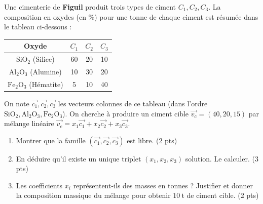 \documentclass[11pt]{article}
\begin{document}
\begin{exercice}
Une cimenterie de \textbf{Figuil} produit trois types de ciment $C_1, C_2, C_3$. La composition en oxydes (en \%) pour une tonne de chaque ciment est résumée dans le tableau ci-dessous :

\begin{center}
\begin{tabular}{|c|c|c|c|}
\hline
\textbf{Oxyde} & $C_1$ & $C_2$ & $C_3$ \\ \hline
$\text{SiO}_2$ (Silice) & 60 & 20 & 10 \\ \hline
$\text{Al}_2\text{O}_3$ (Alumine) & 10 & 30 & 20 \\ \hline
$\text{Fe}_2\text{O}_3$ (Hématite) & 5 & 10 & 40 \\ \hline
\end{tabular}
\end{center}

On note $\vec{c_1},\vec{c_2},\vec{c_3}$ les vecteurs colonnes de ce tableau (dans l'ordre $\text{SiO}_2, \text{Al}_2\text{O}_3, \text{Fe}_2\text{O}_3$). On cherche à produire un ciment cible $\vec{v_c} = (40, 20, 15)$ par mélange linéaire $\vec{v_c} = x_1\vec{c_1} + x_2\vec{c_2} + x_3\vec{c_3}$.
\begin{enumerate}
    \item Montrer que la famille $(\vec{c_1},\vec{c_2},\vec{c_3})$ est libre. \hfill (2 pts)
    \item En déduire qu'il existe un unique triplet $(x_1,x_2,x_3)$ solution. Le calculer. \hfill (3 pts)
    \item Les coefficients $x_i$ représentent-ils des masses en tonnes ? Justifier et donner la composition massique du mélange pour obtenir $\SI{10}{\tonne}$ de ciment cible. \hfill (2 pts)
\end{enumerate}
\end{exercice}
\end{document}
